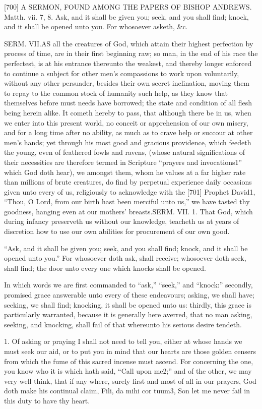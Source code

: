 [700]
A SERMON, FOUND AMONG THE PAPERS OF BISHOP ANDREWS.
Matth. vii. 7, 8.
Ask, and it shall be given you; seek, and you shall find; knock, and it shall be opened unto you. For whosoever asketh, &c.

SERM. VII.AS all the creatures of God, which attain their highest perfection by process of time, are in their first beginning raw; so man, in the end of his race the perfectest, is at his entrance thereunto the weakest, and thereby longer enforced to continue a subject for other men’s compassions to work upon voluntarily, without any other persuader, besides their own secret inclination, moving them to repay to the common stock of humanity such help, as they know that themselves before must needs have borrowed; the state and condition of all flesh being herein alike. It cometh hereby to pass, that although there be in us, when we enter into this present world, no conceit or apprehension of our own misery, and for a long time after no ability, as much as to crave help or succour at other men’s hands; yet through his most good and gracious providence, which feedeth the young, even of feathered fowls and ravens, (whose natural significations of their necessities are therefore termed in Scripture “prayers and invocations1” which God doth hear), we amongst them, whom he values at a far higher rate than millions of brute creatures, do find by perpetual experience daily occasions given unto every of us, religiously to acknowledge with the [701] Prophet David1, “Thou, O Lord, from our birth hast been merciful unto us,” we have tasted thy goodness, hanging even at our mothers’ breasts.SERM. VII. 1. That God, which during infancy preserveth us without our knowledge, teacheth us at years of discretion how to use our own abilities for procurement of our own good.

“Ask, and it shall be given you; seek, and you shall find; knock, and it shall be opened unto you.” For whosoever doth ask, shall receive; whosoever doth seek, shall find; the door unto every one which knocks shall be opened.

In which words we are first commanded to “ask,” “seek,” and “knock:” secondly, promised grace answerable unto every of these endeavours; asking, we shall have; seeking, we shall find; knocking, it shall be opened unto us: thirdly, this grace is particularly warranted, because it is generally here averred, that no man asking, seeking, and knocking, shall fail of that whereunto his serious desire tendeth.

1. Of asking or praying I shall not need to tell you, either at whose hands we must seek our aid, or to put you in mind that our hearts are those golden censers from which the fume of this sacred incense must ascend. For concerning the one, you know who it is which hath said, “Call upon me2;” and of the other, we may very well think, that if any where, surely first and most of all in our prayers, God doth make his continual claim, Fili, da mihi cor tuum3, Son let me never fail in this duty to have thy heart.

